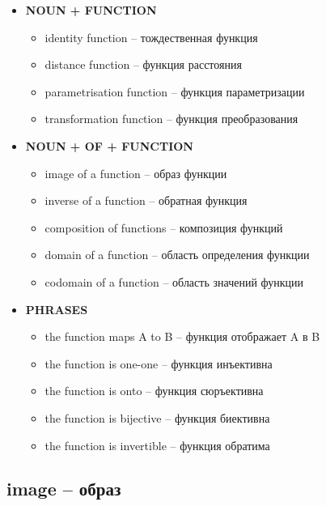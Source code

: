 \documentclass[a4paper, 10pt]{article}
\theoremstyle{definition}
\theoremstyle{plain}
\theoremstyle{remark}
\begin{document}
\begin{itemize}
    \item \textbf{NOUN + FUNCTION}
    \begin{itemize}
        \item identity function – тождественная функция
        \item distance function – функция расстояния
        \item parametrisation function – функция параметризации
        \item transformation function – функция преобразования
    \end{itemize}
    
    \item \textbf{NOUN + OF + FUNCTION}
    \begin{itemize}
        \item image of a function – образ функции
        \item inverse of a function – обратная функция
        \item composition of functions – композиция функций
        \item domain of a function – область определения функции
        \item codomain of a function – область значений функции
    \end{itemize}
    
    \item \textbf{PHRASES}
    \begin{itemize}
        \item the function maps A to B – функция отображает A в B
        \item the function is one-one – функция инъективна
        \item the function is onto – функция сюръективна
        \item the function is bijective – функция биективна
        \item the function is invertible – функция обратима
    \end{itemize}
\end{itemize}

\subsection{image – образ}
\end{document}
